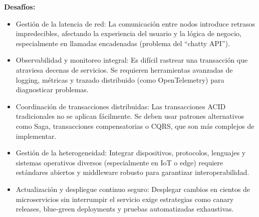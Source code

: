 \documentclass[a4paper,12pt]{article}
\begin{document}
\textbf{Desafíos:}
\begin{itemize}
    \item Gestión de la latencia de red: La comunicación entre nodos introduce retrasos impredecibles, afectando la experiencia del usuario y la lógica de negocio, especialmente en llamadas encadenadas (problema del “chatty API”).
    \item Observabilidad y monitoreo integral: Es difícil rastrear una transacción que atraviesa decenas de servicios. Se requieren herramientas avanzadas de logging, métricas y trazado distribuido (como OpenTelemetry) para diagnosticar problemas.
    \item Coordinación de transacciones distribuidas: Las transacciones ACID tradicionales no se aplican fácilmente. Se deben usar patrones alternativos como Saga, transacciones compensatorias o CQRS, que son más complejos de implementar.
    \item Gestión de la heterogeneidad: Integrar dispositivos, protocolos, lenguajes y sistemas operativos diversos (especialmente en IoT o edge) requiere estándares abiertos y middleware robusto para garantizar interoperabilidad.
    \item Actualización y despliegue continuo seguro: Desplegar cambios en cientos de microservicios sin interrumpir el servicio exige estrategias como canary releases, blue-green deployments y pruebas automatizadas exhaustivas.
\end{itemize}
\end{document}
